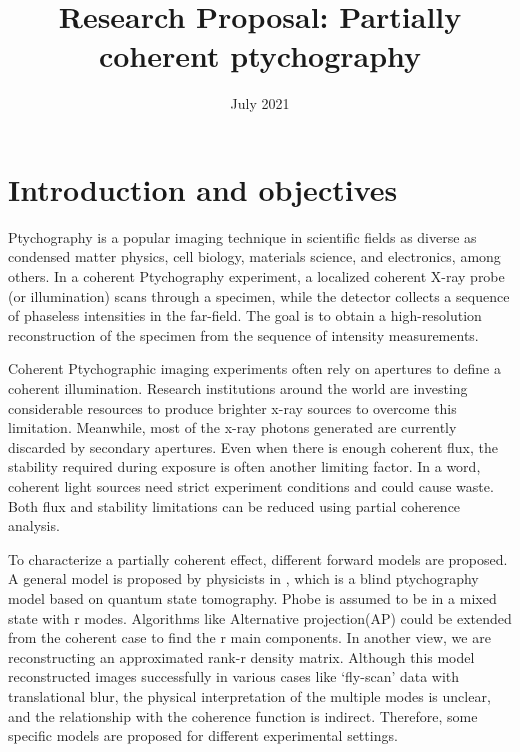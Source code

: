 \documentclass{article}
\title{Research Proposal: Partially coherent ptychography}
\date{July 2021}
\numberwithin{equation}{section}
\begin{document}
\maketitle
\tableofcontents
\section{Introduction and objectives}


Ptychography is a popular imaging technique in scientific fields as diverse as condensed matter physics, cell biology, materials science, and electronics, among others. In a coherent Ptychography experiment, a localized coherent X-ray probe (or illumination) scans through a specimen, while the detector collects a sequence of phaseless intensities in the far-field. The goal is to obtain a high-resolution reconstruction of the specimen from the sequence of intensity measurements. 

Coherent Ptychographic imaging experiments often rely on apertures to define a coherent illumination. Research institutions around the world are investing considerable resources to produce brighter x-ray sources to overcome this limitation. Meanwhile, most of the x-ray photons generated are currently discarded by secondary apertures. Even when there is enough coherent flux, the stability required during exposure is often another limiting factor. In a word, coherent light sources need strict experiment conditions and could cause waste. Both flux and stability limitations can be reduced using partial coherence analysis. 

To characterize a partially coherent effect, different forward models are proposed. A general model is proposed by physicists in \cite{mix}, which is a blind ptychography model based on quantum state tomography. Phobe is assumed to be in a mixed state with r modes. Algorithms like Alternative projection(AP) could be extended from the coherent case to find the r main components. In another view, we are reconstructing an approximated rank-r density matrix. Although this model reconstructed images successfully in various cases like ‘fly-scan’ data with translational blur, the physical interpretation of the multiple modes is unclear, and the relationship with the coherence function is indirect. Therefore, some specific models are proposed for different experimental settings\cite{psf}. 
\end{document}

